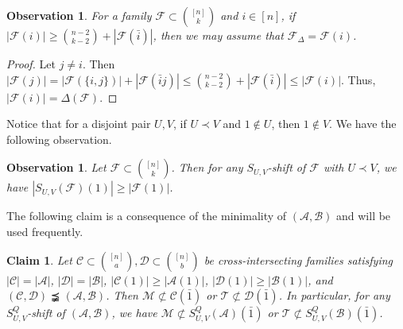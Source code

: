 \documentclass[11pt]{article}
\newcommand{\m}{\mathcal}
\newtheorem{claim}[theorem]{Claim}
\newtheorem{obser}[theorem]{Observation}
\begin{document}
\begin{obser}\label{obser2}
    For a family $\m F\subset {[n]\choose k}$ and $i\in [n]$, if $|\m F(i)|\ge {n-2\choose k-2}+|\m F(\bar i)|$, then we may assume that $\m F_{\Delta}=\m F(i)$.
\end{obser}
\begin{proof}
    Let $j\ne i$. Then $|\m F(j)|=|\m F(\{i,j\})|+|\m F(\bar i j)|\le {n-2\choose k-2}+|\m F(\bar i)|\le |\m F(i)|$. Thus, $|\m F(i)| = \Delta(\m F)$.
\end{proof}

Notice that for a disjoint pair $U,V$, if $U\prec V$ and $1\not\in U$, then $1\not\in V$. We have the following observation.
\begin{obser}\label{obser}
Let $\m F\subset {[n]\choose k}$. Then for any $S_{U,V}$-shift of $\m F$ with $U\prec V$, we have $|S_{U,V}(\m F)(1)|\ge |\m F(1)|$. 
\end{obser}


The following claim is a consequence of the minimality of $(\m A, \m B)$ and will be  used frequently. 

\begin{claim}\label{11-3-4}
Let $\mathcal{C}\subset{[n]\choose a}, \mathcal{D}\subset {[n]\choose b}$ be cross-intersecting families satisfying  $|\mathcal{C}|= |\mathcal{A}|$, $|\mathcal{D}|= |\mathcal{B}|$,
$|\m C(1)|\ge |\m A(1)|$, $|\m D(1)|\ge |\m B(1)|$,
 and $(\mathcal{C}, \mathcal{D})\precneqq (\mathcal{A},\mathcal{B})$. 
 Then $\mathcal{M}\not\subset \mathcal{C}(\bar1)$ or $\mathcal{T}\not\subset \mathcal{D}(\bar1)$. 
 In particular, 
for any $S^Q_{U,V}$-shift  of $(\m A, \m B)$, 
we have $\mathcal{M}\not\subset S^Q_{U,V}(\mathcal{A})(\bar1)$ or $\mathcal{T}\not\subset S^Q_{U,V}(\mathcal{B})(\bar1)$.  
\end{claim}
\end{document}

